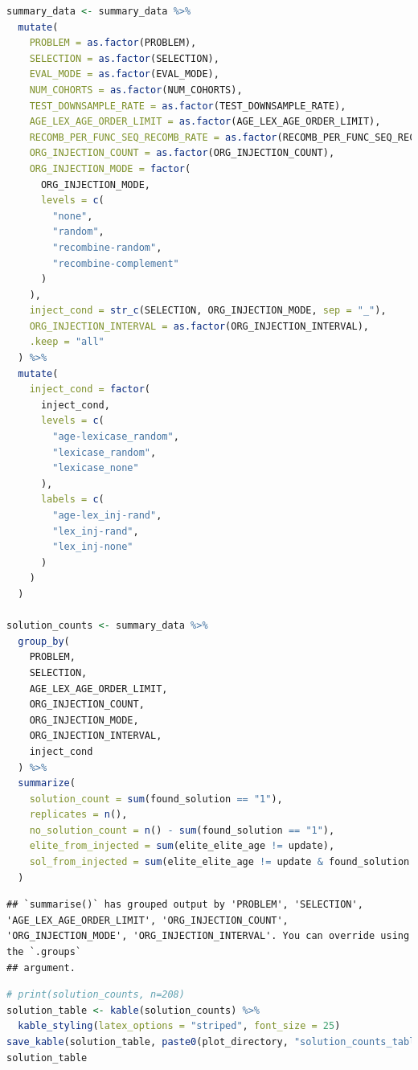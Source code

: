 \documentclass[
]{book}
\begin{document}
\begin{lstlisting}[language=R]
summary_data <- summary_data %>%
  mutate(
    PROBLEM = as.factor(PROBLEM),
    SELECTION = as.factor(SELECTION),
    EVAL_MODE = as.factor(EVAL_MODE),
    NUM_COHORTS = as.factor(NUM_COHORTS),
    TEST_DOWNSAMPLE_RATE = as.factor(TEST_DOWNSAMPLE_RATE),
    AGE_LEX_AGE_ORDER_LIMIT = as.factor(AGE_LEX_AGE_ORDER_LIMIT),
    RECOMB_PER_FUNC_SEQ_RECOMB_RATE = as.factor(RECOMB_PER_FUNC_SEQ_RECOMB_RATE),
    ORG_INJECTION_COUNT = as.factor(ORG_INJECTION_COUNT),
    ORG_INJECTION_MODE = factor(
      ORG_INJECTION_MODE,
      levels = c(
        "none",
        "random",
        "recombine-random",
        "recombine-complement"
      )
    ),
    inject_cond = str_c(SELECTION, ORG_INJECTION_MODE, sep = "_"),
    ORG_INJECTION_INTERVAL = as.factor(ORG_INJECTION_INTERVAL),
    .keep = "all"
  ) %>%
  mutate(
    inject_cond = factor(
      inject_cond,
      levels = c(
        "age-lexicase_random",
        "lexicase_random",
        "lexicase_none"
      ),
      labels = c(
        "age-lex_inj-rand",
        "lex_inj-rand",
        "lex_inj-none"
      )
    )
  )

solution_counts <- summary_data %>%
  group_by(
    PROBLEM,
    SELECTION,
    AGE_LEX_AGE_ORDER_LIMIT,
    ORG_INJECTION_COUNT,
    ORG_INJECTION_MODE,
    ORG_INJECTION_INTERVAL,
    inject_cond
  ) %>%
  summarize(
    solution_count = sum(found_solution == "1"),
    replicates = n(),
    no_solution_count = n() - sum(found_solution == "1"),
    elite_from_injected = sum(elite_elite_age != update),
    sol_from_injected = sum(elite_elite_age != update & found_solution == "1")
  )
\end{lstlisting}

\begin{lstlisting}
## `summarise()` has grouped output by 'PROBLEM', 'SELECTION', 'AGE_LEX_AGE_ORDER_LIMIT', 'ORG_INJECTION_COUNT', 'ORG_INJECTION_MODE', 'ORG_INJECTION_INTERVAL'. You can override using the `.groups`
## argument.
\end{lstlisting}

\begin{lstlisting}[language=R]
# print(solution_counts, n=208)
solution_table <- kable(solution_counts) %>%
  kable_styling(latex_options = "striped", font_size = 25)
save_kable(solution_table, paste0(plot_directory, "solution_counts_table.pdf"))
solution_table
\end{lstlisting}
\end{document}
